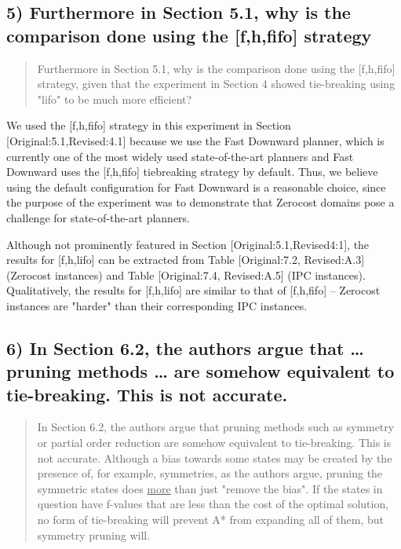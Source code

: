 \documentclass{article}
\begin{document}
\subsection{\label{orgtarget1} 5) Furthermore in Section 5.1, why is the comparison done using the [f,h,fifo] strategy}
\label{sec:orgheadline30}

\begin{quote}
 Furthermore in Section 5.1, why is the comparison done using the
[f,h,fifo] strategy, given that the experiment in Section 4 showed
tie-breaking using "lifo" to be much more efficient?
\end{quote}

We used the [f,h,fifo] strategy in this experiment in Section [Original:5.1,Revised:4.1] because
we use the Fast Downward planner, which is currently one of the most widely used state-of-the-art planners
and Fast Downward uses the [f,h,fifo] tiebreaking strategy by default.
Thus, we believe using the default configuration for Fast Downward is a reasonable choice, since the purpose of the experiment was to demonstrate that Zerocost domains pose a challenge for state-of-the-art planners.

Although not prominently featured in Section [Original:5.1,Revised4:1], 
the results for [f,h,lifo] can be extracted from 
Table [Original:7.2, Revised:A.3] (Zerocost instances) and Table [Original:7.4, Revised:A.5] (IPC instances).
Qualitatively, the results for [f,h,lifo] are similar to that of [f,h,fifo] -- Zerocost instances are "harder" than their corresponding IPC instances.

\subsection{6) In Section 6.2, the authors argue that \ldots{} pruning methods \ldots{} are somehow equivalent to tie-breaking. This is not accurate.}
\label{sec:orgheadline31}

\begin{quote}
 In Section 6.2, the authors argue that pruning methods such as
symmetry or partial order reduction are somehow equivalent to
tie-breaking. This is not accurate. Although a bias towards some
states may be created by the presence of, for example, symmetries, as
the authors argue, pruning the symmetric states does \underline{more} than just
"remove the bias". If the states in question have f-values that are
less than the cost of the optimal solution, no form of tie-breaking
will prevent A* from expanding all of them, but symmetry pruning will.
\end{quote}
\end{document}
